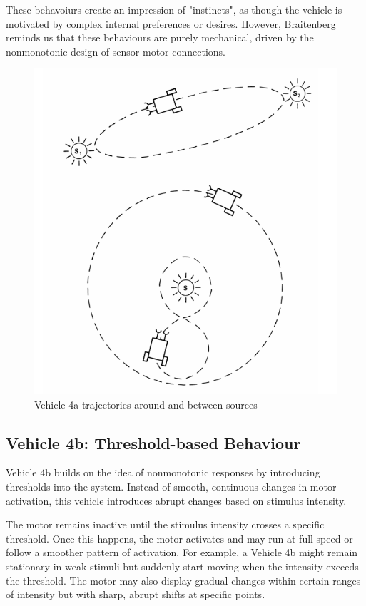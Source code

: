 \documentclass{article}
\begin{document}
	These behavoiurs create an impression of "instincts", as though the vehicle is motivated by complex internal preferences or desires. However, Braitenberg reminds us that these behaviours are purely mechanical, driven by the nonmonotonic design of sensor-motor connections.
	
	\begin{figure}[h]
		\centering
		\includegraphics[scale=0.6]{images/figure_7.png}
		\caption{Vehicle 4a trajectories around and between sources}
		\label{fig:vehicle-4a}
	\end{figure}

	\subsection*{Vehicle 4b: Threshold-based Behaviour}
	Vehicle 4b builds on the idea of nonmonotonic responses by introducing thresholds into the system. Instead of smooth, continuous changes in motor activation, this vehicle introduces abrupt changes based on stimulus intensity.

	The motor remains inactive until the stimulus intensity crosses a specific threshold. Once this happens, the motor activates and may run at full speed or follow a smoother pattern of activation. For example, a Vehicle 4b might remain stationary in weak stimuli but suddenly start moving when the intensity exceeds the threshold. The motor may also display gradual changes within certain ranges of intensity but with sharp, abrupt shifts at specific points.
\end{document}
